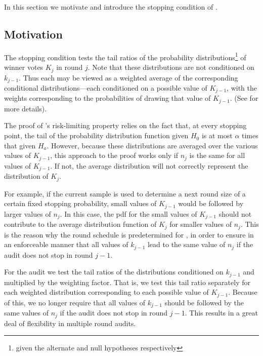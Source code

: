 In this section we motivate and introduce the stopping condition of \Providence.

\subsection{Motivation}
\label{sec:prov_motivation}
The \Minerva stopping condition tests the tail ratios of the probability distributions\footnote{given the alternate and null hypotheses respectively} of winner votes $K_j$ in round $j$. Note that these distributions are not conditioned on $k_{j-1}$. Thus each may be viewed as a weighted average of the corresponding conditional distributions---each conditioned on a possible value of $K_{j-1}$, with the weights corresponding to the probabilities of drawing that value of $K_{j-1}$. (See \cite{usenix_minerva} for more details). 

The proof of \Minerva's risk-limiting property relies on the fact that, at every stopping point, the tail of the probability distribution function given $H_0$ is at most $\alpha$ times that given $H_a$. However, because these distributions are averaged over the various values of $K_{j-1}$, this approach to the proof works only if $n_j$ is the same for all values of $K_{j-1}$. If not, the average distribution will not correctly represent the distribution of $K_j$. 

For example, if the current sample is used to determine a next round size of a certain fixed stopping probability, small values of $K_{j-1}$ would be followed by larger values of $n_j$.  In this case, the pdf for the small values of $K_{j-1}$ should not contribute to the average distribution function of $K_j$ for smaller values of $n_j$. This is the reason why the round schedule is predetermined for \Minerva, in order to ensure in an enforceable manner that all values of $k_{j-1}$ lead to the same value of $n_j$ if the audit does not stop in round $j-1$. 

For the \Providence audit we test the tail ratios of the distributions conditioned on $k_{j-1}$ and multiplied by the weighting factor. That is, we test this tail ratio separately for each weighted distribution corresponding to each possible value of $K_{j-1}$. Because of this, we no longer require that all values of $k_{j-1}$ should be followed by the same values of $n_j$ if the audit does not stop in round $j-1$. This results in a great deal of flexibility in multiple round audits. 

